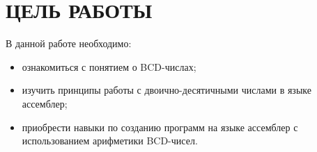 \section{ЦЕЛЬ РАБОТЫ}

В данной работе необходимо:

\begin{itemize}

  \item ознакомиться с понятием о BCD-числах;

  \item изучить принципы работы с двоично-десятичными числами в языке ассемблер;

  \item приобрести навыки по созданию программ на языке ассемблер с использованием
  арифметики BCD-чисел.

\end{itemize}

\newpage
